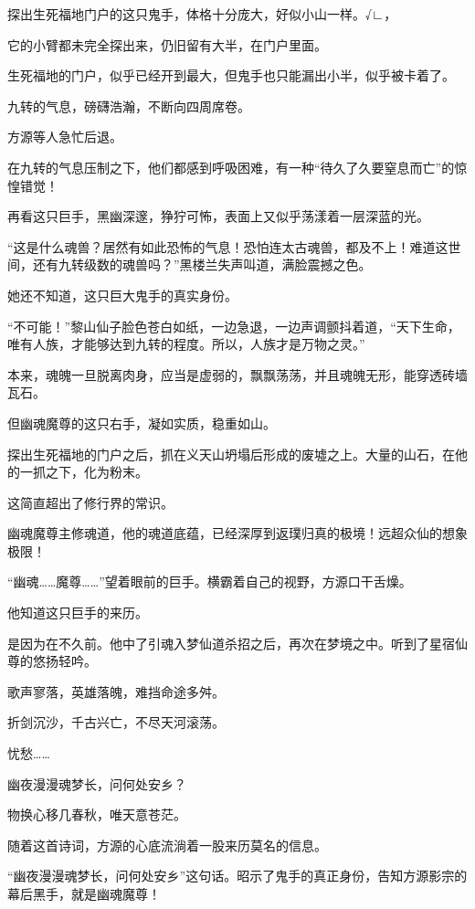 
\begin{this_body}

探出生死福地门户的这只鬼手，体格十分庞大，好似小山一样。√∟，

它的小臂都未完全探出来，仍旧留有大半，在门户里面。

生死福地的门户，似乎已经开到最大，但鬼手也只能漏出小半，似乎被卡着了。

九转的气息，磅礴浩瀚，不断向四周席卷。

方源等人急忙后退。

在九转的气息压制之下，他们都感到呼吸困难，有一种“待久了久要窒息而亡”的惊惶错觉！

再看这只巨手，黑幽深邃，狰狞可怖，表面上又似乎荡漾着一层深蓝的光。

“这是什么魂兽？居然有如此恐怖的气息！恐怕连太古魂兽，都及不上！难道这世间，还有九转级数的魂兽吗？”黑楼兰失声叫道，满脸震撼之色。

她还不知道，这只巨大鬼手的真实身份。

“不可能！”黎山仙子脸色苍白如纸，一边急退，一边声调颤抖着道，“天下生命，唯有人族，才能够达到九转的程度。所以，人族才是万物之灵。”

本来，魂魄一旦脱离肉身，应当是虚弱的，飘飘荡荡，并且魂魄无形，能穿透砖墙瓦石。

但幽魂魔尊的这只右手，凝如实质，稳重如山。

探出生死福地的门户之后，抓在义天山坍塌后形成的废墟之上。大量的山石，在他的一抓之下，化为粉末。

这简直超出了修行界的常识。

幽魂魔尊主修魂道，他的魂道底蕴，已经深厚到返璞归真的极境！远超众仙的想象极限！

“幽魂……魔尊……”望着眼前的巨手。横霸着自己的视野，方源口干舌燥。

他知道这只巨手的来历。

是因为在不久前。他中了引魂入梦仙道杀招之后，再次在梦境之中。听到了星宿仙尊的悠扬轻吟。

歌声寥落，英雄落魄，难挡命途多舛。

折剑沉沙，千古兴亡，不尽天河滚荡。

忧愁……

幽夜漫漫魂梦长，问何处安乡？

物换心移几春秋，唯天意苍茫。

随着这首诗词，方源的心底流淌着一股来历莫名的信息。

“幽夜漫漫魂梦长，问何处安乡”这句话。昭示了鬼手的真正身份，告知方源影宗的幕后黑手，就是幽魂魔尊！


\end{this_body}
